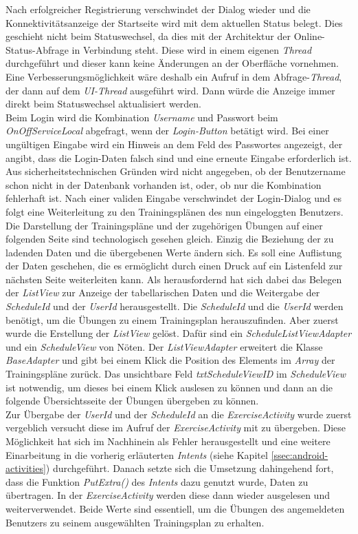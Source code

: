 Nach erfolgreicher Registrierung verschwindet der Dialog wieder und die Konnektivitätsanzeige der Startseite wird mit dem aktuellen Status belegt. Dies geschieht nicht beim Statuswechsel, da dies mit der Architektur der Online-Status-Abfrage in Verbindung steht. Diese wird in einem eigenen \textit{Thread} durchgeführt und dieser kann keine Änderungen an der Oberfläche vornehmen. Eine Verbesserungsmöglichkeit wäre deshalb ein Aufruf in dem Abfrage-\textit{Thread}, der dann auf dem \textit{UI-Thread} ausgeführt wird. Dann würde die Anzeige immer direkt beim Statuswechsel aktualisiert werden.\\
Beim Login wird die Kombination \textit{Username} und Passwort beim \textit{OnOffServiceLocal} abgefragt, wenn der \textit{Login-Button} betätigt wird. Bei einer ungültigen Eingabe wird ein Hinweis an dem Feld des Passwortes angezeigt, der angibt, dass die Login-Daten falsch sind und eine erneute Eingabe erforderlich ist. Aus sicherheitstechnischen Gründen wird nicht angegeben, ob der Benutzername schon nicht in der Datenbank vorhanden ist, oder, ob nur die Kombination fehlerhaft ist. Nach einer validen Eingabe verschwindet der Login-Dialog und es folgt eine Weiterleitung zu den Trainingsplänen des nun eingeloggten Benutzers.\\
Die Darstellung der Trainingspläne und der zugehörigen Übungen auf einer folgenden Seite sind technologisch gesehen gleich. Einzig die Beziehung der zu ladenden Daten und die übergebenen Werte ändern sich. Es soll eine Auflistung der Daten geschehen, die es ermöglicht durch einen Druck auf ein Listenfeld zur nächsten Seite weiterleiten kann. Als herausfordernd hat sich dabei das Belegen der \textit{ListView} zur Anzeige der tabellarischen Daten und die Weitergabe der \textit{ScheduleId} und der \textit{UserId} herausgestellt. Die \textit{ScheduleId} und die \textit{UserId} werden benötigt, um die Übungen zu einem Trainingsplan herauszufinden. Aber zuerst wurde die Erstellung der \textit{ListView} gelöst. Dafür sind ein \textit{ScheduleListViewAdapter} und ein \textit{ScheduleView} von Nöten. Der \textit{ListViewAdapter} erweitert die Klasse \textit{BaseAdapter} und gibt bei einem Klick die Position des Elements im \textit{Array} der Trainingspläne zurück. Das unsichtbare Feld \textit{txtScheduleViewID} im \textit{ScheduleView} ist notwendig, um dieses bei einem Klick auslesen zu können und dann an die folgende Übersichtsseite der Übungen übergeben zu können.\\
Zur Übergabe der \textit{UserId} und der \textit{ScheduleId} an die \textit{ExerciseActivity} wurde zuerst vergeblich versucht diese im Aufruf der \textit{ExerciseActivity} mit zu übergeben. Diese Möglichkeit hat sich im Nachhinein als Fehler herausgestellt und eine weitere Einarbeitung in die vorherig erläuterten \textit{Intents} (siehe Kapitel \ref{ssec:android-activities}) durchgeführt. Danach setzte sich die Umsetzung dahingehend fort, dass die Funktion \textit{PutExtra()} des \textit{Intents} dazu genutzt wurde, Daten zu übertragen. In der \textit{ExerciseActivity} werden diese dann wieder ausgelesen und weiterverwendet. Beide Werte sind essentiell, um die Übungen des angemeldeten Benutzers zu seinem ausgewählten Trainingsplan zu erhalten.\\
